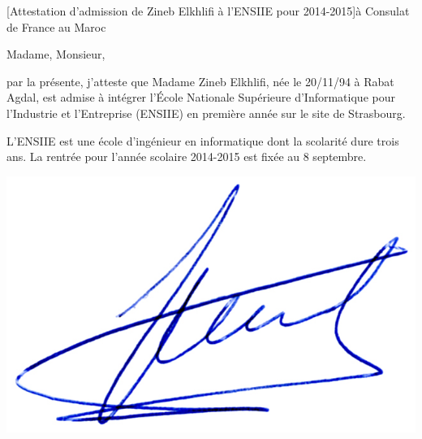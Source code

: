 \documentclass[a4paper,10pt]{article}
\begin{document}

\begin{letter}[Attestation d'admission de Zineb Elkhlifi à l'ENSIIE pour 2014-2015]{à}%
{Consulat de France au Maroc}


Madame, Monsieur,


\vspace{1cm}
par la présente, j'atteste que Madame Zineb Elkhlifi, née le 20/11/94 à Rabat
Agdal, est admise à intégrer l'École Nationale Supérieure d'Informatique pour
l'Industrie et l'Entreprise (ENSIIE) en première année sur le site de Strasbourg. 


\vspace{1cm}
L'ENSIIE est une école d'ingénieur en informatique dont la scolarité dure trois
ans. La rentrée pour l'année scolaire 2014-2015 est fixée au 8 septembre.
 
\hfill


\end{letter}
\begin{flushright}
\includegraphics[width=.2\textwidth]{signgenaud.jpg}
\end{flushright}
\end{document}
